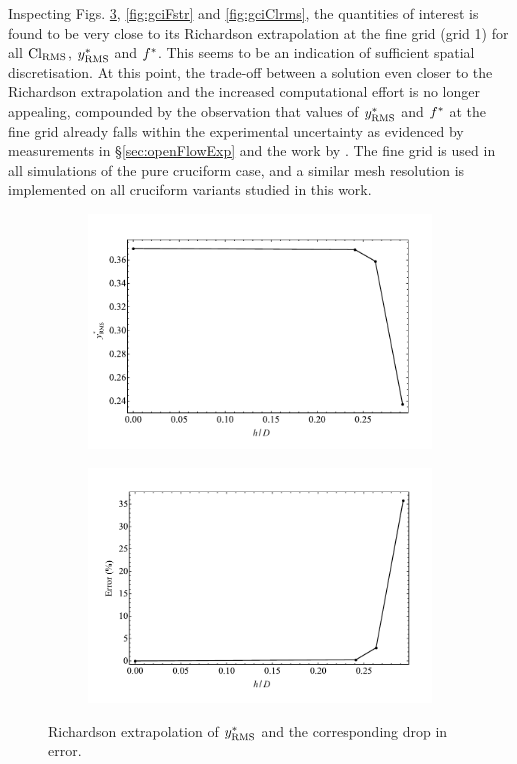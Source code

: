 \documentclass[oneside]{utmthesis}
\begin{document}
Inspecting Figs. \ref{fig:gciYrms}, \ref{fig:gciFstr} and \ref{fig:gciClrms}, the quantities of interest is found to be very close to its Richardson extrapolation at the fine grid (grid 1) for all $\text{Cl}_{\text{RMS}}$, $y^{*}_{\text{RMS}}$ and $f^{*}$. This seems to be an indication of sufficient spatial discretisation. At this point, the trade-off between a solution even closer to the Richardson extrapolation and the increased computational effort is no longer appealing, compounded by the observation that values of $y^{*}_{\text{RMS}}$ and $f^{*}$ at the fine grid already falls within the experimental uncertainty as evidenced by measurements in \S \ref{sec:openFlowExp} and the work by \citet{Koide2013}. The fine grid is used in all simulations of the pure cruciform case, and a similar mesh resolution is implemented on all cruciform variants studied in this work.

\begin{figure}
  \centering
  \begin{subfigure}[h]{1\textwidth}
    \includegraphics[width=\textwidth]{figs/gciYrms-1}
    \caption{}
    \label{fig:gciYrms-1}
  \end{subfigure}

  \begin{subfigure}[h]{1\textwidth}
    \includegraphics[width=\textwidth]{figs/gciYrms-2}
    \caption{}
    \label{fig:gciYrms-2}
  \end{subfigure}

  \caption{Richardson extrapolation of $y^{*}_{\text{RMS}}$ and the corresponding drop in error.} \label{fig:gciYrms}
\end{figure}
\end{document}
